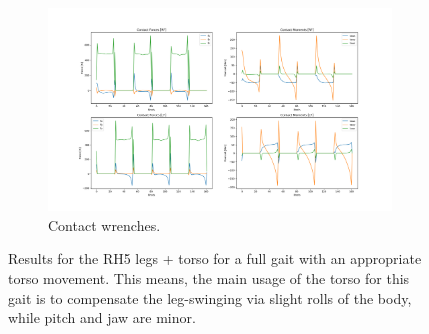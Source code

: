 \begin{figure}[h!]
\begin{subfigure}{.5\textwidth}
  \centering
\includegraphics[width=1\linewidth]{Media/Crocoddyl/RH5Torso/FixTorsoFalling/RH5TorsoGait_FixFalling_ContactWrenches.png}
\caption{Contact wrenches.}
\end{subfigure}
\caption{Results for the RH5 legs + torso for a full gait with an appropriate torso movement. This means, the main usage of the torso for this gait is to compensate the leg-swinging via slight rolls of the body, while pitch and jaw are minor.}
\label{fig:rh5Torso_full_gait}
\centering
\end{figure}








 